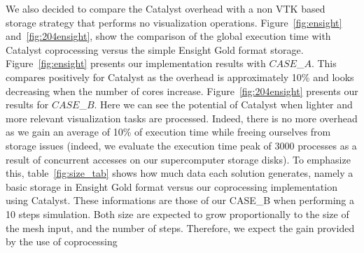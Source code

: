We also decided to compare the Catalyst overhead with a non VTK based 
storage strategy that performs no visualization operations. Figure~\ref{fig:ensight} and~\ref{fig:204ensight}, 
show the comparison of the global execution time with Catalyst coprocessing
versus the simple Ensight Gold format storage. Figure~\ref{fig:ensight} presents
our implementation results with $CASE$\_$A$. This compares positively for Catalyst as the overhead
is approximately 10\% and looks decreasing when the number of cores increase.
Figure~\ref{fig:204ensight} presents our results for $CASE$\_$B$. Here we can see the potential of Catalyst when 
lighter and more relevant visualization tasks are processed. Indeed, there is no more 
overhead as we gain an average of 10\% of execution time while freeing
ourselves from storage issues (indeed, we evaluate the execution time peak of
3000 processes as a result of concurrent accesses on our 
supercomputer storage
disks). To emphasize this, table~\ref{fig:size_tab} shows how much data each
solution generates, namely a basic storage in Ensight Gold format versus our
coprocessing implementation using Catalyst. These informations are those of our
CASE\_B when performing a 10 steps simulation. Both size are
expected to grow proportionally to the size of the mesh input, and the number of
steps. Therefore, we expect the gain provided by the use of coprocessing 
\clearpage
